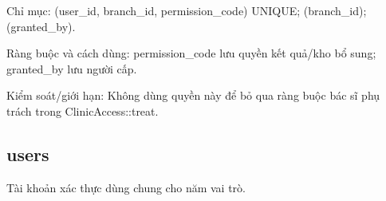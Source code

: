 Chỉ mục:\allowbreak{} (user\_\allowbreak{}id, branch\_\allowbreak{}id, permission\_\allowbreak{}code) UNIQUE; (branch\_\allowbreak{}id); (granted\_\allowbreak{}by).\allowbreak{}

Ràng buộc và cách dùng:\allowbreak{} permission\_\allowbreak{}code lưu quyền kết quả/\allowbreak{}kho bổ sung; granted\_\allowbreak{}by lưu người cấp.\allowbreak{}

Kiểm soát/\allowbreak{}giới hạn:\allowbreak{} Không dùng quyền này để bỏ qua ràng buộc bác sĩ phụ trách trong Clinic\allowbreak{}Access:\allowbreak{}:\allowbreak{}treat.\allowbreak{}

\clearpage

\subsection{users}
Tài khoản xác thực dùng chung cho năm vai trò.\allowbreak{}


